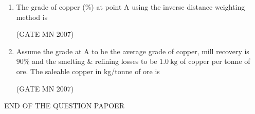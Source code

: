 \documentclass[journal]{IEEEtran}
\begin{document}
\begin{enumerate}
\item The grade of copper (\%) at point A using the inverse distance weighting method is  
\begin{enumerate}
\end{enumerate}
\hfill (GATE MN 2007)
\item Assume the grade at A to be the average grade of copper, mill recovery is $90\%$ and the smelting \& refining losses to be $1.0 \ \mathrm{kg}$ of copper per tonne of ore. The saleable copper in kg/tonne of ore is  
\begin{enumerate}
\end{enumerate}

\hfill (GATE MN 2007)




\end{enumerate}
\begin{center}                                  
\huge{END OF THE QUESTION PAPOER}    
\end{center}
\end{document}
